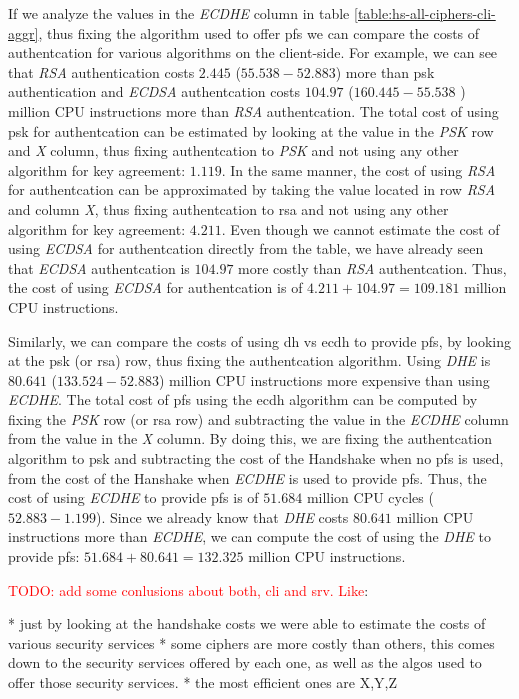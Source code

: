 \documentclass{llncs}
\newcommand{\todo}[1]{\textcolor{red}{TODO: #1}\PackageWarning{TODO:}{#1!}}
\begin{document}
If we analyze the values in the \textit{ECDHE} column in table \ref{table:hs-all-ciphers-cli-aggr}, thus fixing the
algorithm used to offer \gls{pfs} we can compare the costs of authentcation for various algorithms on the client-side.
For example, we can see that \textit{RSA} authentication costs $2.445$  ($55.538 - 52.883$) more than \gls{psk} authentication and \textit{ECDSA} authentcation costs $104.97$ ($160.445 - 55.538$ ) million CPU instructions more than
\textit{RSA} authentcation. The total cost of using \gls{psk} for authentcation can be estimated by looking at the
value in the \textit{PSK} row and \textit{X} column, thus fixing authentcation to \textit{PSK} and not using any other
algorithm for key agreement: $1.119$. In the same manner, the cost of using \textit{RSA} for authentcation can
be approximated by taking the value located in row \textit{RSA} and column \textit{X}, thus fixing authentcation
to \gls{rsa} and not using any other algorithm for key agreement: $4.211$. Even though we cannot estimate the cost
of using \textit{ECDSA} for authentcation directly from the table, we have already seen that \textit{ECDSA} authentcation
is $104.97$ more costly than \textit{RSA} authentcation. Thus, the cost of using \textit{ECDSA} for authentcation
is of $4.211+104.97=109.181$ million CPU instructions.

Similarly, we can compare the costs of using \gls{dh} vs \gls{ecdh} to provide \gls{pfs}, by
looking at the \gls{psk} (or \gls{rsa}) row, thus fixing the authentcation algorithm. Using \textit{DHE} is 
$80.641$ ($133.524 - 52.883$) million CPU instructions more expensive than using \textit{ECDHE}. The total cost of \gls{pfs}
using the \gls{ecdh} algorithm can be computed by fixing the \textit{PSK} row (or \gls{rsa} row) 
and subtracting the value in the \textit{ECDHE} column from the value in the \textit{X} column. By doing this, we are 
fixing the authentcation algorithm to \gls{psk} and subtracting the cost of the Handshake when no \gls{pfs} is used, 
from the cost of the Hanshake when \textit{ECDHE} is used to provide \gls{pfs}. Thus, the cost of using \textit{ECDHE}
to provide \gls{pfs} is of $51.684$ million CPU cycles ($52.883-1.199$). Since we already know that \textit{DHE} costs
$80.641$ million CPU instructions more than \textit{ECDHE}, we can compute the cost of using the \textit{DHE} to
provide \gls{pfs}: $51.684+80.641=132.325$ million CPU instructions.

\todo{add some conlusions about both, cli and srv. Like}:

* just by looking at the handshake costs we were able to estimate the costs of various security services
* some ciphers are more costly than others, this comes down to the security services offered by each one, as well
  as the algos used to offer those security services.
* the most efficient ones are X,Y,Z
\end{document}
